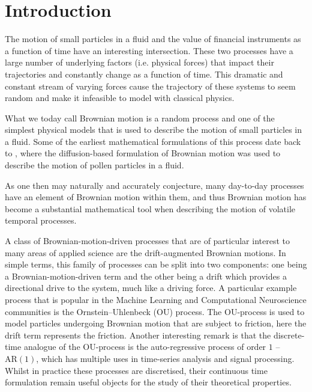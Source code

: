 \documentclass[a4paper,12pt,twoside,openright]{report}
\theoremstyle{definition}
\begin{document}
\pagestyle{empty}
\singlespacing

\onehalfspacing

\singlespacing


\setcounter{page}{0}
\pagestyle{plain}
\tableofcontents
\listoffigures
\listoftables

\onehalfspacing


 \chapter{Introduction}
 
 The motion of small particles in a fluid and the value of financial instruments as a function of time have an interesting intersection. These two processes have a large number of underlying factors (i.e. physical forces) that impact their trajectories and constantly change as a function of time. This dramatic and constant stream of varying forces cause the trajectory of these systems to seem random and make it infeasible  to model with classical physics. 
 
 What we today call Brownian motion is a random process and one of the simplest physical models that is used to describe the motion of small particles in a fluid. Some of the earliest mathematical formulations of this process date back to \cite{einstein1905motion}, where the diffusion-based formulation of Brownian motion was used to describe the motion of pollen particles in a fluid.
 
 As one then may naturally and accurately conjecture, many day-to-day processes have an element of Brownian motion within them, and thus Brownian motion has become a substantial mathematical tool when describing the motion of volatile temporal processes.
 
 A class of Brownian-motion-driven processes that are of particular interest to many areas of applied science are the drift-augmented Brownian motions. In simple terms, this family of processes can be split into two components: one being a Brownian-motion-driven term and the other being a drift which provides a directional drive to the system, much like a driving force.  A particular example process that is popular in the Machine Learning and Computational Neuroscience communities is the Ornstein–Uhlenbeck (OU) process. The OU-process is used to model particles undergoing Brownian motion that are subject to friction, here the drift term represents the friction. Another interesting remark is that the discrete-time analogue of the OU-process is the auto-regressive process of order $1$ -- $\text{AR}(1)$, which has multiple uses in time-series analysis and signal processing. Whilst in practice these processes are discretised, their continuous time formulation remain useful objects for the study of their theoretical properties.
 
\end{document}
